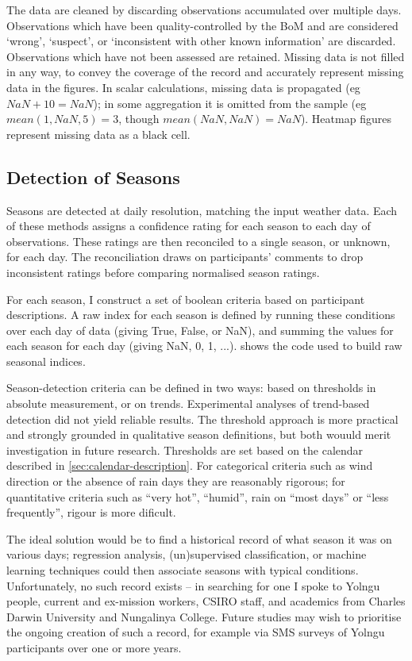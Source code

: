 The data are cleaned by discarding observations accumulated over multiple days.
Observations which have been quality-controlled by the BoM and are considered
`wrong', `suspect', or `inconsistent with other known information' are discarded.
Observations which have not been assessed are retained.
%
Missing data is not filled in any way, to convey the coverage of the record
and accurately represent missing data in the figures.  In scalar calculations,
missing data is propagated (eg ${NaN+10=NaN}$); in some aggregation
it is omitted from the sample (eg ${mean(1,NaN,5)=3}$, though
${mean(NaN,NaN)=NaN}$). Heatmap figures represent missing data as a black cell.


\subsection{Detection of Seasons}
\label{meth:seas-detection}

Seasons are detected at daily resolution, matching the input weather data.
Each of these methods assigns a confidence rating for each season to each day of
observations.  These ratings are then reconciled to a single season, or unknown,
for each day.  The reconciliation draws on participants' comments to drop inconsistent
ratings before comparing normalised season ratings.

For each season, I construct a set of boolean criteria based on participant
descriptions.  A raw index for each season is defined by
running these conditions over each day of data (giving True, False, or NaN),
and summing the values for each season for each day (giving NaN, 0, 1, ...).
 shows the code used to build raw
seasonal indices.

Season-detection criteria can be defined in two ways: based on thresholds
in absolute measurement, or on trends.  Experimental analyses of trend-based
detection did not yield reliable results.  The threshold approach is more
practical and strongly grounded in qualitative season definitions, but both
wouuld merit investigation in future research.
%
Thresholds are set based on the calendar described in \cref{sec:calendar-description}.
For categorical criteria such as wind direction or the absence of rain days
they are reasonably rigorous; for quantitative criteria
such as ``very hot'', ``humid'', rain on ``most days'' or ``less frequently'',
rigour is more dificult.

The ideal solution would be to find a historical record of what season
it was on various days; regression analysis, (un)supervised classification,
or machine learning techniques could then associate seasons with typical
conditions.  Unfortunately, no such record exists -- in searching for one
I spoke to Yolngu people, current and ex-mission workers, CSIRO staff,
and academics from Charles Darwin University and Nungalinya College.
Future studies may wish to prioritise the ongoing creation of such a record,
for example via SMS surveys of Yolngu participants over one or more years.

